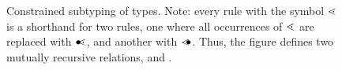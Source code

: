 \begin{figure}
{\begin{minipage}{\ruleswidth}
\begin{mathpar}
\end{mathpar}
\end{minipage}}
\caption{Constrained subtyping of types.
    Note: %
    every rule with the symbol $\symsubctr$ is a shorthand for two rules, 
    one where all occurrences of $\symsubctr$ are replaced with 
    $\symsubctrL$, and another with $\symsubctrR$.
    Thus, the figure defines two mutually recursive relations,
     and .
}\label{fig:subtyping-constrained}
\end{figure}


\begin{figure}
\footnotesize
{}
\end{figure}
